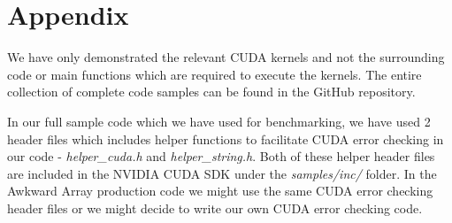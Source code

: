 \documentclass{article}
\begin{document}
\section{Appendix}
We have only demonstrated the relevant CUDA kernels and not the surrounding code or main functions which are required to execute the kernels. The entire collection of complete code samples can be found in the GitHub repository.\par
In our full sample code which we have used for benchmarking, we have used 2 header files which includes helper functions to facilitate CUDA error checking in our code - \textit{helper\_cuda.h} and \textit{helper\_string.h}. Both of these helper header files are included in the NVIDIA CUDA SDK under the \textit{samples/inc/} folder. In the Awkward Array production code we might use the same CUDA error checking header files or we might decide to write our own CUDA error checking code.



\end{document}
